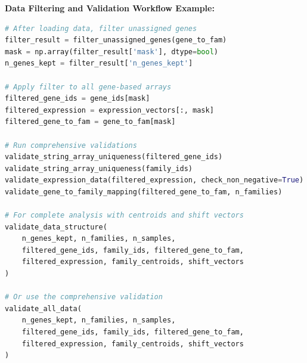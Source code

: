 \documentclass[11pt]{article}
\begin{document}
\begin{enumerate}
\begin{itemize}
	      	      \textbf{Data Filtering and Validation Workflow Example:} 
	      	      \begin{lstlisting}[language=Python, caption={Python Data Filtering and Validation Workflow}]
# After loading data, filter unassigned genes
filter_result = filter_unassigned_genes(gene_to_fam)
mask = np.array(filter_result['mask'], dtype=bool)
n_genes_kept = filter_result['n_genes_kept']

# Apply filter to all gene-based arrays
filtered_gene_ids = gene_ids[mask]
filtered_expression = expression_vectors[:, mask]
filtered_gene_to_fam = gene_to_fam[mask]

# Run comprehensive validations
validate_string_array_uniqueness(filtered_gene_ids)
validate_string_array_uniqueness(family_ids)
validate_expression_data(filtered_expression, check_non_negative=True)
validate_gene_to_family_mapping(filtered_gene_to_fam, n_families)

# For complete analysis with centroids and shift vectors
validate_data_structure(
	n_genes_kept, n_families, n_samples, 
	filtered_gene_ids, family_ids, filtered_gene_to_fam,
	filtered_expression, family_centroids, shift_vectors
)

# Or use the comprehensive validation
validate_all_data(
	n_genes_kept, n_families, n_samples,
	filtered_gene_ids, family_ids, filtered_gene_to_fam,
	filtered_expression, family_centroids, shift_vectors
)
	      	\end{lstlisting}
	      \end{itemize}
\end{enumerate}
\end{document}
